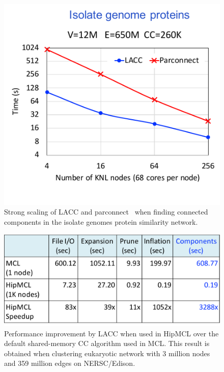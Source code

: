 \begin{figure}[!t]
   \centering
   \includegraphics[scale=.5]{figures/isolates} %
   \caption{Strong scaling of LACC and parconnect~\cite{jain2017adaptive} when finding connected components in  the isolate genomes protein similarity network. }
   \label{fig:isolates}
\end{figure}

\begin{figure}[!t]
   \centering
   \includegraphics[scale=.5]{figures/hipmcl} %
   \caption{Performance improvement by LACC when used in HipMCL over the default shared-memory CC algorithm used in MCL. This result is obtained when clustering eukaryotic network with 3 million nodes and 359 million edges on NERSC/Edison.}
   \label{fig:hipmcl}
\end{figure}


